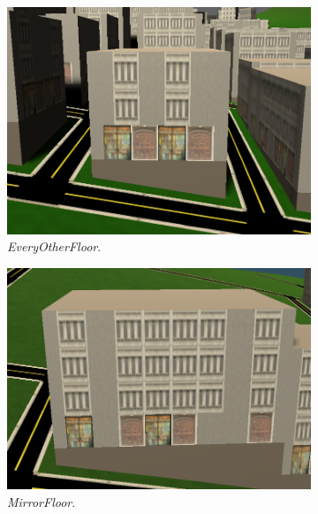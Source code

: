\begin{figure}[H]
  \centering

  \begin{subfigure}[b]{0.25\textwidth}
    \includegraphics[width=\textwidth]{figure/building-every-other.PNG}
    \caption{\textit{EveryOtherFloor}.}
  \end{subfigure}
  \quad
  \begin{subfigure}[b]{0.25\textwidth}
    \includegraphics[width=\textwidth]{figure/building-normal.PNG}
    \caption{\textit{MirrorFloor}.}
  \end{subfigure}
  \quad
  \begin{subfigure}[b]{0.25\textwidth}

\end{subfigure}
\end{figure}
